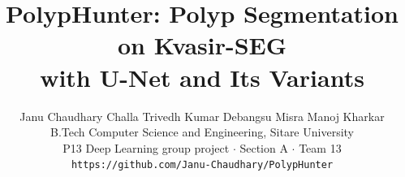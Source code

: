 \documentclass[10pt,twocolumn,letterpaper]{article}
\title{PolypHunter: Polyp Segmentation on Kvasir-SEG\\with U-Net and Its Variants}
\author{%
  Janu Chaudhary \qquad Challa Trivedh Kumar \qquad Debangsu Misra \qquad Manoj Kharkar\\[4pt]
  {\normalsize B.Tech Computer Science and Engineering, Sitare University}\\[2pt]
  {\small P13 Deep Learning group project $\cdot$ Section A $\cdot$ Team 13}\\[2pt]
  {\small\tt https://github.com/Janu-Chaudhary/PolypHunter}
}
\begin{document}
\maketitle











{
  \small
  
  
}
\end{document}

